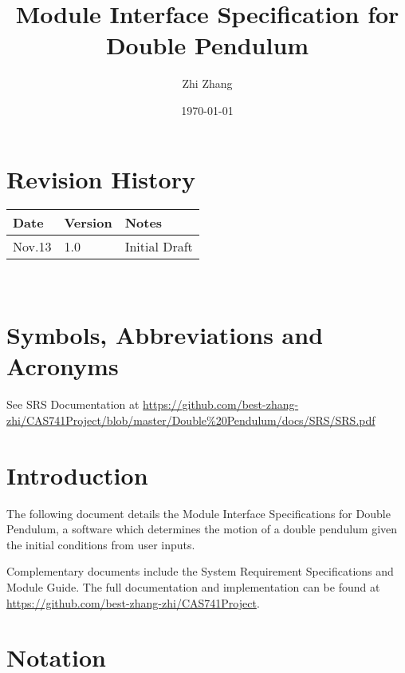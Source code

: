 \documentclass[12pt, titlepage]{article}
\begin{document}
\title{Module Interface Specification for Double Pendulum}

\author{Zhi Zhang}

\date{\today}

\maketitle


\section{Revision History}

\begin{tabularx}{\textwidth}{p{3cm}p{2cm}X}
\toprule {\bf Date} & {\bf Version} & {\bf Notes}\\
\midrule
Nov.13 & 1.0 & Initial Draft\\
\bottomrule
\end{tabularx}

~\newpage

\section{Symbols, Abbreviations and Acronyms}

See SRS Documentation at \url{https://github.com/best-zhang-zhi/CAS741Project/blob/master/Double%20Pendulum/docs/SRS/SRS.pdf}

\newpage

\tableofcontents

\newpage


\section{Introduction}

The following document details the Module Interface Specifications for Double Pendulum, a software which determines the motion of a double pendulum given the initial conditions from user inputs. 

Complementary documents include the System Requirement Specifications
and Module Guide.  The full documentation and implementation can be
found at \url{https://github.com/best-zhang-zhi/CAS741Project}.  

\section{Notation}
\end{document}
